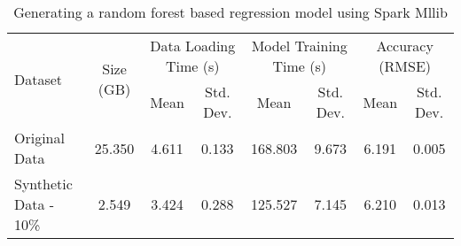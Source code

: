 \begin{table*}
    \renewcommand{\arraystretch}{1.3}
    \caption{Generating a random forest based regression model using Spark Mllib}
    \label{tab:resource-util}
    \begin{center}
        \begin{tabularx}{0.98\textwidth}{|X|c|c|c|c|c|c|c|}
            \hline
            \multirow{2}{*}{Dataset} & \multirow{2}{*}{Size (GB)} & \multicolumn{2}{c|}{\cellcolor[gray]{0.7}Data Loading Time (s)} &\multicolumn{2}{c|}{\cellcolor[gray]{0.7}Model Training Time (s)} & \multicolumn{2}{c|}{\cellcolor[gray]{0.7}Accuracy (RMSE)}\\
            \cline{3-8}
             & & \cellcolor[gray]{0.9}Mean & \cellcolor[gray]{0.9}Std. Dev.  &  \cellcolor[gray]{0.9}Mean & \cellcolor[gray]{0.9}Std. Dev. &  \cellcolor[gray]{0.9}Mean & \cellcolor[gray]{0.9}Std. Dev. \\
            \hline
            Original Data & 25.350 & 4.611 & 0.133 & 168.803 & 9.673 & 6.191 & 0.005 \\
            \hline
            Synthetic Data - 10\% & 2.549 & 3.424 & 0.288 & 125.527 & 7.145 & 6.210 & 0.013 \\
            \hline
		\end{tabularx}
	\end{center}
\end{table*}
